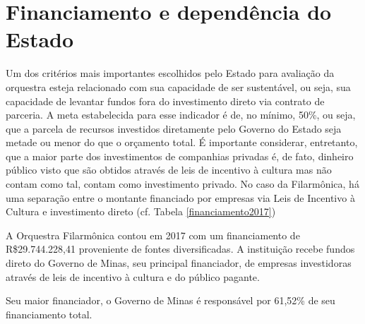 \documentclass[a4paper, 12pt, openright, oneside, german, french, english, brazil]{abntex2}
\begin{document}
	
	
	\section{Financiamento e dependência do Estado}
	
	
	Um dos critérios mais importantes escolhidos pelo Estado para avaliação da orquestra esteja relacionado com sua capacidade de ser sustentável, ou seja, sua capacidade de levantar fundos fora do investimento direto via contrato de parceria. A meta estabelecida para esse indicador é de, no mínimo, 50\%, ou seja, que a parcela de recursos investidos diretamente pelo Governo do Estado seja metade ou menor do que o orçamento total. É importante considerar, entretanto, que a maior parte dos investimentos de companhias privadas é, de fato, dinheiro público visto que são obtidos através de leis de incentivo à cultura mas não contam como tal, contam como investimento privado. No caso da Filarmônica, há uma separação entre o montante financiado por empresas via Leis de Incentivo à Cultura e investimento direto (cf. Tabela \ref{financiamento2017})
	
	A Orquestra Filarmônica contou em 2017 com um financiamento de R\$29.744.228,41 \cite{minas2017aditivo} proveniente de fontes diversificadas. A instituição recebe fundos direto do Governo de Minas, seu principal financiador, de empresas investidoras através de leis de incentivo à cultura e do público pagante.
	
	
	Seu maior financiador, o Governo de Minas é responsável por 61,52\% de seu financiamento total.
	
	
	
\end{document}
